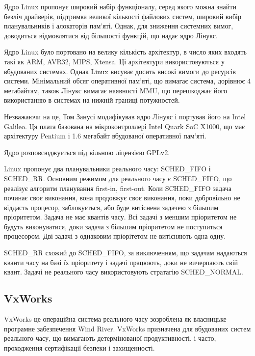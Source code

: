 \documentclass[main.tex]{subfiles}
\begin{document}
Ядро Linux\cite{linux} пропонує широкий набір функціоналу, серед якого можна знайти безліч драйверів, підтримка великої кількості файлових систем, широкий вибір планувальників і алокаторів пам'яті. Однак, для зниження системних вимог, доводиться відмовлятися від більшості функцій, що надає ядро Лінукс.

Ядро Linux було портовано на велику кількість архітектур, в число яких входять такі як ARM, AVR32, MIPS, Xtensa. Ці архітектури використовуються у вбудованих системах. Однак Linux висуває досить високі вимоги до ресурсів системи. Мінімальний обсяг оперативної пам'яті, що вимагає система, дорівнює 4 мегабайтам, також Лінукс вимагає наявності \ac{MMU}, що перешкоджає його використанню в системах на нижній границі потужностей.

Незважаючи на це, Том Занусі модифікував ядро Лінукс і портував його на Intel Galileo\cite{linux-galileo}. Ця плата базована на мікроконтроллері Intel Quark SoC X1000, що має архітектуру Pentium і 1.6 мегабайт вбудованої оперативної пам'яті\cite{intel-galileo}.

Ядро розповсюджується під вільною ліцензією GPLv2.

\newcommand{\FIFO}[0]{SCHED\_FIFO}
\newcommand{\RR}[0]{SCHED\_RR}

Linux пропонує два планувальники реального часу\cite{linux:schedulers}: SCHED\_FIFO і SCHED\_RR. Основним режимом для реального часу є SCHED\_FIFO, що реалізує алгоритм планування first-in, first-out. Коли \FIFO{} задача починає своє виконання, вона продовжує своє виконання, поки добровільно не віддасть процесор, заблокується, або буде витіснена задачею з більшим пріоритетом. Задача не має квантів часу. Всі задачі з меншим пріоритетом не будуть виконуватися, доки задача з більшим пріоритетом не поступиться процесором. Дві задачі з однаковим пріорітетом не витісняють одна одну.

\RR{} схожий до \FIFO{}, за виключенням, що задачам надаються кванти часу на базі їх пріоритету і задачі працюють, доки не вичерпають свій квант. Задачі не реального часу використовують стратагію SCHED\_NORMAL.

\subsection{VxWorks}

VxWorks\cite{vxworks} це операційна система реального часу зозроблена як власницьке програмне забезпечення Wind River. VxWorks призначена для вбудованих систем реального часу, що вимагають детермінованої продуктивності, і часто, проходження сертифікації безпеки і захищенності.
\end{document}
